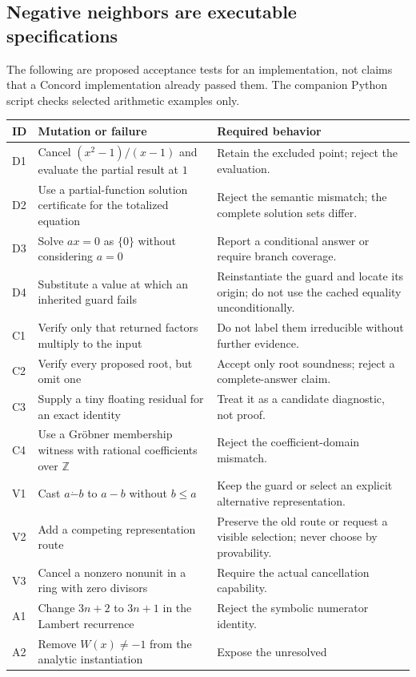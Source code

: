 \documentclass[11pt,a4paper]{article}
\newcommand{\Z}{\mathbb Z}
\theoremstyle{remark}
\begin{document}
\subsection{Negative neighbors are executable specifications}
The following are proposed acceptance tests for an implementation, not claims
that a Concord implementation already passed them. The companion Python script
checks selected arithmetic examples only.
\begin{longtable}{@{}L{.07\textwidth}L{.47\textwidth}L{.38\textwidth}@{}}
\toprule
ID & Mutation or failure & Required behavior \\
\midrule
\endhead
D1 & Cancel $(x^2-1)/(x-1)$ and evaluate the partial result at $1$ & Retain the
excluded point; reject the evaluation.\\
D2 & Use a partial-function solution certificate for the totalized equation &
Reject the semantic mismatch; the complete solution sets differ.\\
D3 & Solve $ax=0$ as $\{0\}$ without considering $a=0$ & Report a conditional
answer or require branch coverage.\\
D4 & Substitute a value at which an inherited guard fails & Reinstantiate the
guard and locate its origin; do not use the cached equality unconditionally.\\
C1 & Verify only that returned factors multiply to the input & Do not label them
irreducible without further evidence.\\
C2 & Verify every proposed root, but omit one & Accept only root soundness;
reject a complete-answer claim.\\
C3 & Supply a tiny floating residual for an exact identity & Treat it as a
candidate diagnostic, not proof.\\
C4 & Use a Gr\"obner membership witness with rational coefficients over $\Z$ &
Reject the coefficient-domain mismatch.\\
V1 & Cast $a\dot-b$ to $a-b$ without $b\le a$ & Keep the guard or select an
explicit alternative representation.\\
V2 & Add a competing representation route & Preserve the old route or request
a visible selection; never choose by provability.\\
V3 & Cancel a nonzero nonunit in a ring with zero divisors & Require the actual
cancellation capability.\\
A1 & Change $3n+2$ to $3n+1$ in the Lambert recurrence & Reject the symbolic
numerator identity.\\
A2 & Remove $W(x)\ne-1$ from the analytic instantiation & Expose the unresolved

\end{longtable}
\end{document}

